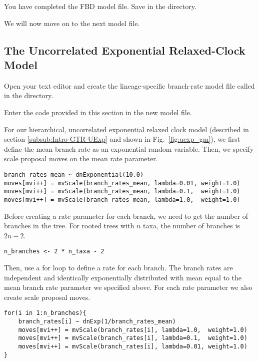 {\begin{framed}
You have completed the FBD model file. Save  in the  directory.

We will now move on to the next model file.
\end{framed}}


\bigskip

\subsection{The Uncorrelated Exponential Relaxed-Clock Model}\label{subsect:Exercise-ModelUExp}

{\begin{framed}
Open your text editor and create the lineage-specific branch-rate model file called {\textcolor{red}{}} in the  directory.

Enter the \Rev code provided in this section in the new model file.
\end{framed}}

For our hierarchical, uncorrelated exponential relaxed clock model (described in section \ref{subsub:Intro-GTR-UExp} and shown in Fig.\ \ref{fig:uexp_gm}), we first define the mean branch rate as an exponential random variable.
Then, we specify scale proposal moves on the mean rate parameter.
{\tt \begin{snugshade*}
\begin{lstlisting}
branch_rates_mean ~ dnExponential(10.0)
moves[mvi++] = mvScale(branch_rates_mean, lambda=0.01, weight=1.0)
moves[mvi++] = mvScale(branch_rates_mean, lambda=0.1,  weight=1.0)
moves[mvi++] = mvScale(branch_rates_mean, lambda=1.0,  weight=1.0)
\end{lstlisting}
\end{snugshade*}}

Before creating a rate parameter for each branch, we need to get the number of branches in the tree. For rooted trees with $n$ taxa, the number of branches is $2n-2$.

{\tt \begin{snugshade*}
\begin{lstlisting}
n_branches <- 2 * n_taxa - 2
\end{lstlisting}
\end{snugshade*}}

Then, use a for loop to define a rate for each branch.
The branch rates are independent and identically exponentially distributed with mean equal to the mean branch rate parameter we specified above.
For each rate parameter we also create scale proposal moves.
{\tt \begin{snugshade*}
\begin{lstlisting}
for(i in 1:n_branches){
    branch_rates[i] ~ dnExp(1/branch_rates_mean)
    moves[mvi++] = mvScale(branch_rates[i], lambda=1.0,  weight=1.0)
    moves[mvi++] = mvScale(branch_rates[i], lambda=0.1,  weight=1.0)
    moves[mvi++] = mvScale(branch_rates[i], lambda=0.01, weight=1.0)
}
\end{lstlisting}
\end{snugshade*}}

